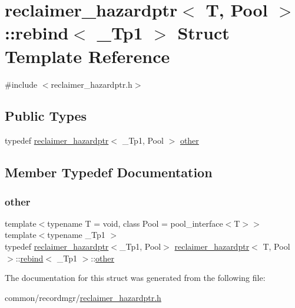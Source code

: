\hypertarget{structreclaimer__hazardptr_1_1rebind}{}\section{reclaimer\+\_\+hazardptr$<$ T, Pool $>$\+:\+:rebind$<$ \+\_\+\+Tp1 $>$ Struct Template Reference}
\label{structreclaimer__hazardptr_1_1rebind}


{\ttfamily \#include $<$reclaimer\+\_\+hazardptr.\+h$>$}

\subsection*{Public Types}
\begin{DoxyCompactItemize}
\item 
typedef \hyperlink{classreclaimer__hazardptr}{reclaimer\+\_\+hazardptr}$<$ \+\_\+\+Tp1, Pool $>$ \hyperlink{structreclaimer__hazardptr_1_1rebind_acc8fd5110f9de9782845f501ae0c55a6}{other}
\end{DoxyCompactItemize}


\subsection{Member Typedef Documentation}
\mbox{\label{structreclaimer__hazardptr_1_1rebind_acc8fd5110f9de9782845f501ae0c55a6}} 
\subsubsection{\texorpdfstring{other}{other}}
{\footnotesize\ttfamily template$<$typename T  = void, class Pool  = pool\+\_\+interface$<$\+T$>$$>$ \\
template$<$typename \+\_\+\+Tp1 $>$ \\
typedef \hyperlink{classreclaimer__hazardptr}{reclaimer\+\_\+hazardptr}$<$\+\_\+\+Tp1, Pool$>$ \hyperlink{classreclaimer__hazardptr}{reclaimer\+\_\+hazardptr}$<$ T, Pool $>$\+::\hyperlink{structreclaimer__hazardptr_1_1rebind}{rebind}$<$ \+\_\+\+Tp1 $>$\+::\hyperlink{structreclaimer__hazardptr_1_1rebind_acc8fd5110f9de9782845f501ae0c55a6}{other}}



The documentation for this struct was generated from the following file\+:\begin{DoxyCompactItemize}
\item 
common/recordmgr/\hyperlink{reclaimer__hazardptr_8h}{reclaimer\+\_\+hazardptr.\+h}\end{DoxyCompactItemize}
